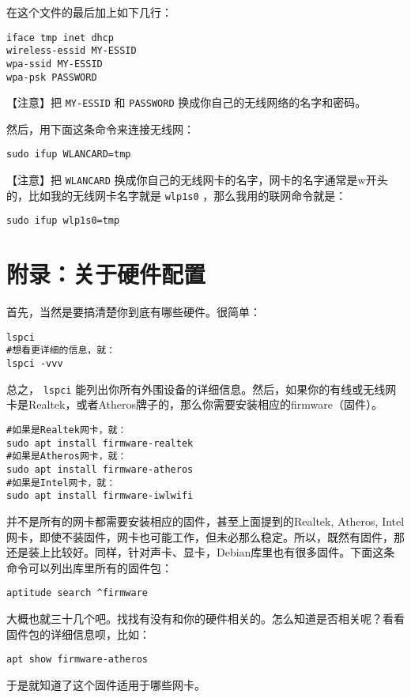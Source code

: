 \documentclass{wx672ctexart}
\begin{document}
在这个文件的最后加上如下几行：
\begin{verbatim}
iface tmp inet dhcp
wireless-essid MY-ESSID
wpa-ssid MY-ESSID
wpa-psk PASSWORD
\end{verbatim}
【注意】把 \texttt{MY-ESSID} 和 \texttt{PASSWORD} 换成你自己的无线网络的名字和密码。

然后，用下面这条命令来连接无线网：
\begin{verbatim}
sudo ifup WLANCARD=tmp
\end{verbatim}
【注意】把 \texttt{WLANCARD} 换成你自己的无线网卡的名字，网卡的名字通常是w开头的，比如我的无线网卡名字就是 \texttt{wlp1s0} ，那么我用的联网命令就是：
\begin{verbatim}
sudo ifup wlp1s0=tmp
\end{verbatim}

\section{附录：关于硬件配置}
\label{sec:org57926af}
首先，当然是要搞清楚你到底有哪些硬件。很简单：
\begin{verbatim}
lspci
#想看更详细的信息，就：
lspci -vvv
\end{verbatim}

总之， \texttt{lspci} 能列出你所有外围设备的详细信息。然后，如果你的有线或无线网卡是Realtek，或者Atheros牌子的，那么你需要安装相应的firmware（固件）。
\begin{verbatim}
#如果是Realtek网卡，就：
sudo apt install firmware-realtek
#如果是Atheros网卡，就：
sudo apt install firmware-atheros
#如果是Intel网卡，就：
sudo apt install firmware-iwlwifi
\end{verbatim}

并不是所有的网卡都需要安装相应的固件，甚至上面提到的Realtek, Atheros, Intel网卡，即使不装固件，网卡也可能工作，但未必那么稳定。所以，既然有固件，那还是装上比较好。同样，针对声卡、显卡，Debian库里也有很多固件。下面这条命令可以列出库里所有的固件包：
\begin{verbatim}
aptitude search ^firmware
\end{verbatim}
大概也就三十几个吧。找找有没有和你的硬件相关的。怎么知道是否相关呢？看看固件包的详细信息呗，比如：
\begin{verbatim}
apt show firmware-atheros
\end{verbatim}
于是就知道了这个固件适用于哪些网卡。
\end{document}
